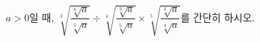 $a>0$일 때, $\sqrt[3]{\dfrac{\sqrt[4]{a}}{\sqrt[5]{a}}}\div\sqrt[4]{\dfrac{\sqrt[3]{a}}{\sqrt[5]{a}}}\times\sqrt[5]{\dfrac{\sqrt[3]{a}}{\sqrt[4]{a}}}$를 간단히 하시오.
